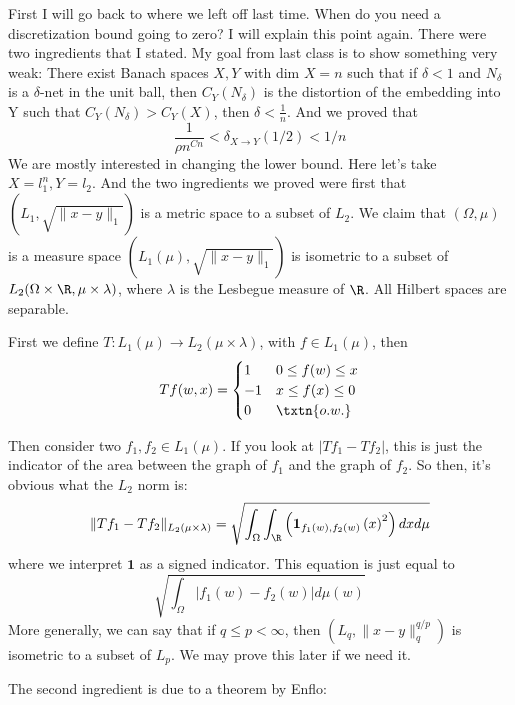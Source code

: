
First I will go back to where we left off last time. When do you need a discretization bound going to zero? 
I will explain this point again. There were two ingredients that I stated. My goal from last class is to show something very weak: 
There exist Banach spaces $X, Y$ with dim $X = n$ such that if $\delta < 1$ and $N_{\delta}$ is a $\delta$-net in the unit ball, then 
$C_Y(N_{\delta})$ is the distortion of the embedding into Y such that $C_Y(N_{\delta}) > C_Y(X)$, then $\delta < \frac{1}{n}$. And we proved that 
\[
\frac{1}{\rho n^{Cn}} < \delta_{X \to Y}(1/2) < 1/n
\]
We are mostly interested in changing the lower bound. 
Here let's take $X = l_1^n, Y = l_2$. And the two ingredients we proved were first that $(L_1, \sqrt{\|x - y\|_1})$ is a metric space to a subset of $L_2$.  
We claim that $(\Omega, \mu)$ is a measure space $(L_1(\mu), \sqrt{\|x - y\|_1})$ is isometric to a subset of $L_2(\Omega \times \R, \mu \times \lambda)$, where $\lambda$ is the Lesbegue measure of $\R$. All Hilbert spaces are separable. 

First we define $T: L_1(\mu) \to L_2(\mu \times \lambda)$, with $f \in L_1(\mu)$, then
\[
Tf(w, x) = 
\begin{cases}
1 & 0 \leq f(w) \leq x \\
-1 & x \leq f(x) \leq 0 \\
0 & \txtn{o.w.}
\end{cases}
\]

Then consider two $f_1, f_2 \in L_1(\mu)$. If you look at $|Tf_1 - Tf_2|$, this is just the indicator of the area between the graph of $f_1$ and the graph of $f_2$. So then, it's obvious what the $L_2$ norm is: 
\[
\|Tf_1 - Tf_2\|_{L_2(\mu \times \lambda)} = \sqrt{\int_{\Omega}\int_{\R}\left(\textbf{1}_{f_1(w), f_2(w)}\left(x\right)^2\right)dxd\mu}
\]
where we interpret $\textbf{1}$ as a signed indicator. This equation is just equal to 
\[
\sqrt{\int_{\Omega} | f_1(w) - f_2(w) | d\mu(w)}
\]
More generally, we can say that if $q \leq p < \infty$, then $(L_q, \|x - y\|_q^{q/p})$ is isometric to a subset of $L_p$. We may prove this later if we need it. 

The second ingredient is due to a theorem by Enflo: 

